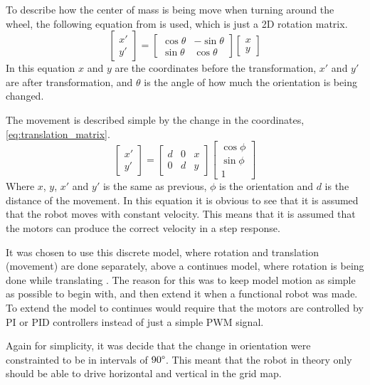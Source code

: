 \documentclass[Main]{subfiles}
\begin{document}
		To describe how the center of mass is being move when turning around the wheel, the following equation from \cite{Wikipedia2015} is used, which is just a 2D rotation matrix.
		\begin{equation}
		\begin{bmatrix} x' \\ y' \end{bmatrix} = \begin{bmatrix} \cos{\theta} & -\sin{\theta} \\ \sin{\theta} & \cos{\theta} \end{bmatrix} \begin{bmatrix} x \\ y \end{bmatrix}
		\end{equation}
		In this equation $x$ and $y$ are the coordinates before the transformation, $x'$ and $y'$ are after transformation, and $\theta$ is the angle of how much the orientation is being changed.

		The movement is described simple by the change in the coordinates, \autoref{eq:translation_matrix}.
		\begin{equation}
		\label{eq:translation_matrix}
		\begin{bmatrix} x' \\ y' \end{bmatrix} = \begin{bmatrix}  d & 0 & x \\ 0 & d & y \end{bmatrix} \begin{bmatrix} \cos{\phi} \\ \sin{\phi} \\ 1 \end{bmatrix} 		
		\end{equation}
		Where $x$, $y$, $x'$ and $y'$ is the same as previous, $\phi$ is the orientation and $d$ is the distance of the movement.
		In this equation it is obvious to see that it is assumed that the robot moves with constant velocity.
		This means that it is assumed that the motors can produce the correct velocity in a step response.

		It was chosen to use this discrete model, where rotation and translation (movement) are done separately, above a continues model, where rotation is being done while translating .
		The reason for this was to keep model motion as simple as possible to begin with, and then extend it when a functional robot was made.
		To extend the model to continues would require that the motors are controlled by PI or PID controllers instead of just a simple PWM signal.

		Again for simplicity, it was decide that the change in orientation were constrainted to be in intervals of $90\degree$.
		This meant that the robot in theory only should be able to drive horizontal and vertical in the grid map. 


\end{document}

